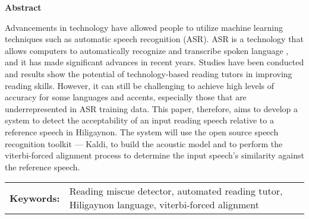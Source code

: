 \begin{center}
\textbf{Abstract}
\end{center}
\setlength{\parindent}{0pt}
Advancements in technology have allowed people to utilize machine learning techniques such as automatic speech recognition (ASR). ASR is a technology that allows computers to automatically recognize and transcribe spoken language , and it has made significant advances in recent years. Studies have been conducted and results show the potential of technology-based reading tutors in improving reading skills. However, it can still be challenging to achieve high levels of accuracy for some languages and accents, especially those that are underrepresented in ASR training data. This paper, therefore, aims to develop a system to detect the acceptability of an input reading speech relative to a reference speech in Hiligaynon. The system will use the open source speech recognition toolkit — Kaldi, to build the acoustic model and to perform the viterbi-forced alignment process to determine the input speech’s similarity against the reference speech.


\begin{tabular}{lp{4.25in}}
\hspace{-0.5em}\textbf{Keywords:}\hspace{0.25em} & Reading miscue detector, automated reading tutor, Hiligaynon language, viterbi-forced alignment\\
\end{tabular}
